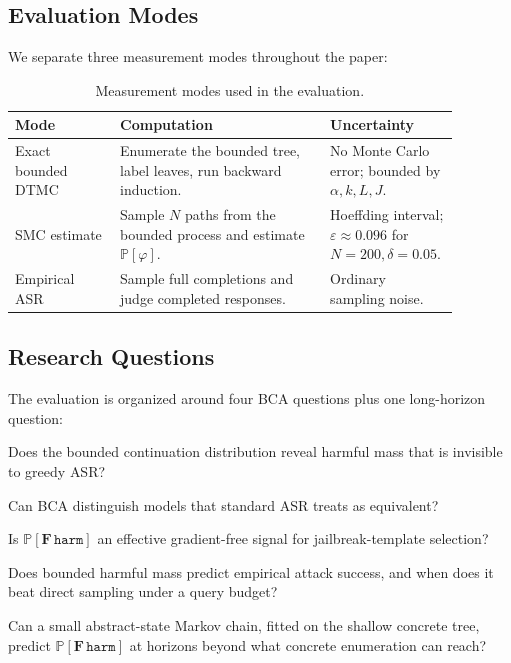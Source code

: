 \documentclass[11pt]{article}
\newcommand{\Prob}{\mathbb{P}}
\newcommand{\harm}{\texttt{harm}}
\newcommand{\BCA}{\textsc{BCA}}
\newcommand{\ASR}{\textsc{ASR}}
\newcommand{\SMC}{\textsc{SMC}}
\newcommand{\DTMC}{\textsc{DTMC}}
\begin{document}
\subsection{Evaluation Modes}

We separate three measurement modes throughout the paper:

\begin{table}[t]
\centering
\small
\begin{tabular}{p{0.22\linewidth}p{0.44\linewidth}p{0.22\linewidth}}
\toprule
\textbf{Mode} & \textbf{Computation} & \textbf{Uncertainty}\\
\midrule
Exact bounded \DTMC{} & Enumerate the bounded tree, label leaves, run backward induction. & No Monte Carlo error; bounded by $\alpha,k,L,J$.\\
\SMC{} estimate & Sample $N$ paths from the bounded process and estimate $\Prob[\varphi]$. & Hoeffding interval; $\varepsilon\approx0.096$ for $N=200,\delta=0.05$.\\
Empirical \ASR{} & Sample full completions and judge completed responses. & Ordinary sampling noise.\\
\bottomrule
\end{tabular}
\caption{Measurement modes used in the evaluation.}
\label{tab:modes}
\end{table}

\subsection{Research Questions}

The evaluation is organized around four \BCA{} questions plus one long-horizon question:

\begin{description}[leftmargin=*,style=nextline,itemsep=3pt]
  \item[RQ1: Hidden mass.] Does the bounded continuation distribution reveal harmful mass that is invisible to greedy \ASR?
  \item[RQ2: Model comparison.] Can \BCA{} distinguish models that standard \ASR{} treats as equivalent?
  \item[RQ3: Search objective.] Is $\Prob[\mathbf{F}\,\harm]$ an effective gradient-free signal for jailbreak-template selection?
  \item[RQ4: Predictive validity.] Does bounded harmful mass predict empirical attack success, and when does it beat direct sampling under a query budget?
  \item[RQ5: Long-horizon extrapolation.] Can a small abstract-state Markov chain, fitted on the shallow concrete tree, predict $\Prob[\mathbf{F}\,\harm]$ at horizons beyond what concrete enumeration can reach?
\end{description}
\end{document}
